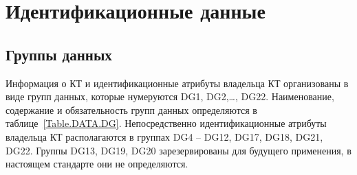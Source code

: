 \chapter{Идентификационные данные}\label{DATA}

\section{Группы данных}\label{DATA.DG}

Информация о КТ и идентификационные атрибуты владельца КТ организованы в 
виде групп данных, которые нумеруются DG1, DG2,\ldots, DG22. 
Наименование, содержание и обязательность групп данных определяются в 
таблице~\ref{Table.DATA.DG}. 
%
Непосредственно идентификационные атрибуты владельца КТ располагаются 
в группах DG4 -- DG12, DG17, DG18, DG21, DG22. 
Группы DG13, DG19, DG20 зарезервированы для будущего 
применения, в настоящем стандарте они не определяются. 

